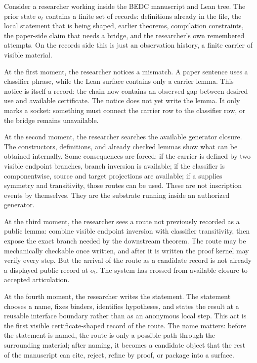 Consider a researcher working inside the BEDC manuscript and Lean tree.  The
prior state $o_t$ contains a finite set of records: definitions already in
the file, the local statement that is being shaped, earlier theorems,
compilation constraints, the paper-side claim that needs a bridge, and the
researcher's own remembered attempts.  On the records side this is just an
observation history, a finite carrier of visible material.

At the first moment, the researcher notices a mismatch.  A paper sentence
uses a classifier phrase, while the Lean surface contains only a carrier
lemma.  This notice is itself a record: the chain now contains an observed
gap between desired use and available certificate.  The notice does not yet
write the lemma.  It only marks a socket: something must connect the carrier
row to the classifier row, or the bridge remains unavailable.

At the second moment, the researcher searches the available generator
closure.  The constructors, definitions, and already checked lemmas show what
can be obtained internally.  Some consequences are forced: if the carrier is
defined by two visible endpoint branches, branch inversion is available; if
the classifier is componentwise, source and target projections are available;
if a \NameCert{} supplies symmetry and transitivity, those routes can be
used.  These are not inscription events by themselves.  They are the
substrate running inside an authorized generator.

At the third moment, the researcher sees a route not previously recorded as
a public lemma: combine visible endpoint inversion with classifier
transitivity, then expose the exact branch needed by the downstream theorem.
The route may be mechanically checkable once written, and after it is written
the proof kernel may verify every step.  But the arrival of the route as a
candidate record is not already a displayed public record at $o_t$.  The
system has crossed from available closure to accepted articulation.

At the fourth moment, the researcher writes the statement.  The statement
chooses a name, fixes binders, identifies hypotheses, and states the result
at a reusable interface boundary rather than as an anonymous local step.
This act is the first visible certificate-shaped record of the route.  The
name matters: before the statement is named, the route is only a possible
path through the surrounding material; after naming, it becomes a candidate
object that the rest of the manuscript can cite, reject, refine by proof, or
package into a \NameCert{} surface.

